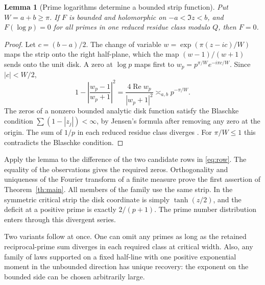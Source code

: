 \documentclass[11pt]{article}
\newtheorem{lemma}[theorem]{Lemma}
\newcommand{\Real}{\operatorname{Re}}
\begin{document}
\begin{lemma}[Prime logarithms determine a bounded strip function]\label{lem:strip}
Put \(W=a+b\ge\pi\). If \(F\) is bounded and holomorphic on \(-a<\Im z<b\), and \(F(\log p)=0\) for all primes in one reduced residue class modulo \(Q\), then \(F=0\).
\end{lemma}
\begin{proof}
Let \(c=(b-a)/2\). The change of variable \(w=\exp(\pi(z-ic)/W)\) maps the strip onto the right half-plane, which the map \((w-1)/(w+1)\) sends onto the unit disk. A zero at \(\log p\) maps first to \(w_p=p^{\pi/W}e^{-i\pi c/W}\). Since \(|c|<W/2\),
\[
 1-\left|\frac{w_p-1}{w_p+1}\right|^2
       =\frac{4\Real w_p}{|w_p+1|^2}\asymp_{a,b} p^{-\pi/W}.
\]
The zeros of a nonzero bounded analytic disk function satisfy the Blaschke condition \(\sum(1-|z_j|)<\infty\), by Jensen's formula after removing any zero at the origin. The sum of \(1/p\) in each reduced residue class diverges \cite{mertens}. For \(\pi/W\le1\) this contradicts the Blaschke condition.
\end{proof}

Apply the lemma to the difference of the two candidate rows in \eqref{eq:row}. The equality of the observations gives the required zeros. Orthogonality and uniqueness of the Fourier transform of a finite measure prove the first assertion of Theorem~\ref{th:main}. All members of the family use the same strip. In the symmetric critical strip the disk coordinate is simply \(\tanh(z/2)\), and the deficit at a positive prime is exactly \(2/(p+1)\). The prime number distribution enters through this divergent series.

Two variants follow at once. One can omit any primes as long as the retained reciprocal-prime sum diverges in each required class at critical width. Also, any family of laws supported on a fixed half-line with one positive exponential moment in the unbounded direction has unique recovery: the exponent on the bounded side can be chosen arbitrarily large.
\end{document}
